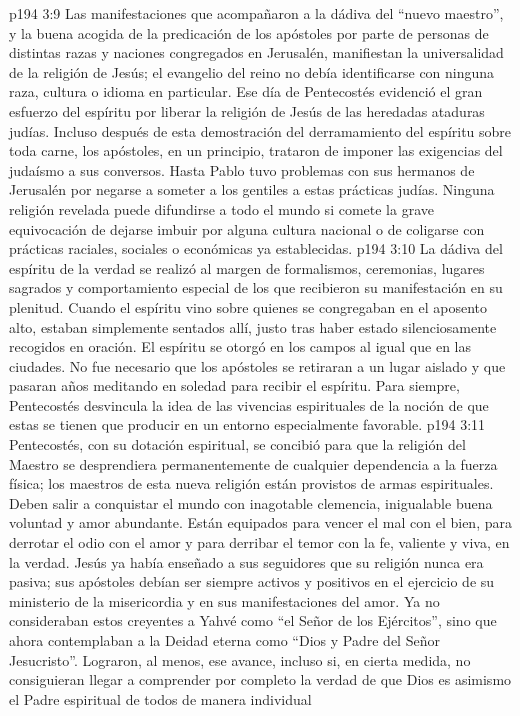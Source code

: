 \vs p194 3:9 Las manifestaciones que acompañaron a la dádiva del “nuevo maestro”, y la buena acogida de la predicación de los apóstoles por parte de personas de distintas razas y naciones congregados en Jerusalén, manifiestan la universalidad de la religión de Jesús; el evangelio del reino no debía identificarse con ninguna raza, cultura o idioma en particular. Ese día de Pentecostés evidenció el gran esfuerzo del espíritu por liberar la religión de Jesús de las heredadas ataduras judías. Incluso después de esta demostración del derramamiento del espíritu sobre toda carne, los apóstoles, en un principio, trataron de imponer las exigencias del judaísmo a sus conversos. Hasta Pablo tuvo problemas con sus hermanos de Jerusalén por negarse a someter a los gentiles a estas prácticas judías. Ninguna religión revelada puede difundirse a todo el mundo si comete la grave equivocación de dejarse imbuir por alguna cultura nacional o de coligarse con prácticas raciales, sociales o económicas ya establecidas.
\vs p194 3:10 La dádiva del espíritu de la verdad se realizó al margen de formalismos, ceremonias, lugares sagrados y comportamiento especial de los que recibieron su manifestación en su plenitud. Cuando el espíritu vino sobre quienes se congregaban en el aposento alto, estaban simplemente sentados allí, justo tras haber estado silenciosamente recogidos en oración. El espíritu se otorgó en los campos al igual que en las ciudades. No fue necesario que los apóstoles se retiraran a un lugar aislado y que pasaran años meditando en soledad para recibir el espíritu. Para siempre, Pentecostés desvincula la idea de las vivencias espirituales de la noción de que estas se tienen que producir en un entorno especialmente favorable.
\vs p194 3:11 \pc Pentecostés, con su dotación espiritual, se concibió para que la religión del Maestro se desprendiera permanentemente de cualquier dependencia a la fuerza física; los maestros de esta nueva religión están provistos de armas espirituales. Deben salir a conquistar el mundo con inagotable clemencia, inigualable buena voluntad y amor abundante. Están equipados para vencer el mal con el bien, para derrotar el odio con el amor y para derribar el temor con la fe, valiente y viva, en la verdad. Jesús ya había enseñado a sus seguidores que su religión nunca era pasiva; sus apóstoles debían ser siempre activos y positivos en el ejercicio de su ministerio de la misericordia y en sus manifestaciones del amor. Ya no consideraban estos creyentes a Yahvé como “el Señor de los Ejércitos”, sino que ahora contemplaban a la Deidad eterna como “Dios y Padre del Señor Jesucristo”. Lograron, al menos, ese avance, incluso si, en cierta medida, no consiguieran llegar a comprender por completo la verdad de que Dios es asimismo el Padre espiritual de todos de manera individual
